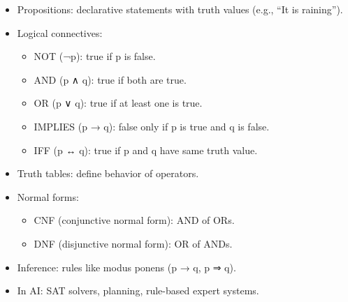 \documentclass[
  letterpaper,
  DIV=11,
  numbers=noendperiod]{scrreprt}
\providecommand{\tightlist}{%
  \setlength{\itemsep}{0pt}\setlength{\parskip}{0pt}}
\begin{document}
\begin{itemize}
\item
  Propositions: declarative statements with truth values (e.g., ``It is
  raining'').
\item
  Logical connectives:

  \begin{itemize}
  \tightlist
  \item
    NOT (¬p): true if p is false.
  \item
    AND (p ∧ q): true if both are true.
  \item
    OR (p ∨ q): true if at least one is true.
  \item
    IMPLIES (p → q): false only if p is true and q is false.
  \item
    IFF (p ↔ q): true if p and q have same truth value.
  \end{itemize}
\item
  Truth tables: define behavior of operators.
\item
  Normal forms:

  \begin{itemize}
  \tightlist
  \item
    CNF (conjunctive normal form): AND of ORs.
  \item
    DNF (disjunctive normal form): OR of ANDs.
  \end{itemize}
\item
  Inference: rules like modus ponens (p → q, p ⇒ q).
\item
  In AI: SAT solvers, planning, rule-based expert systems.
\end{itemize}
\end{document}
